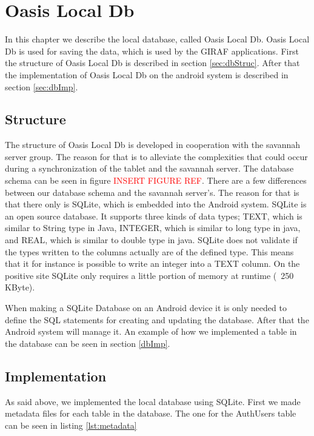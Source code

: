 \chapter{Oasis Local Db}
\label{ch:Db}
In this chapter we describe the local database, called Oasis Local Db. Oasis Local Db is used for saving the data, which is used by the GIRAF applications. First the structure of Oasis Local Db is described in section \vref{sec:dbStruc}. After that the implementation of Oasis Local Db on the android system is described in section \vref{sec:dbImp}.

\section{Structure}
\label{sec:dbStruc}
The structure of Oasis Local Db is developed in cooperation with the savannah server group. The reason for that is to alleviate the complexities that could occur during a synchronization of the tablet and the savannah server. The database schema can be seen in figure \textcolor{red}{INSERT FIGURE REF}. There are a few differences between our database schema and the savannah server's. The reason for that is that there only is SQLite, which is embedded into the Android system. SQLite is an open source database. It supports three kinds of data types; TEXT, which is similar to String type in Java, INTEGER, which is similar to long type in java, and REAL, which is similar to double type in java. SQLite does not validate if the types written to the columns actually are of the defined type. This means that it for instance is possible to write an integer into a TEXT column. On the positive site SQLite only requires a little portion of memory at runtime (~250 KByte).

When making a SQLite Database on an Android device it is only needed to define the SQL statements for creating and updating the database. After that the Android system will manage it. An example of how we implemented a table in the database can be seen in section \vref{dbImp}.

\section{Implementation}
\label{sec:dbImp}
As said above, we implemented the local database using SQLite. First we made metadata files for each table in the database. The one for the AuthUsers table can be seen in listing \vref{lst:metadata}

